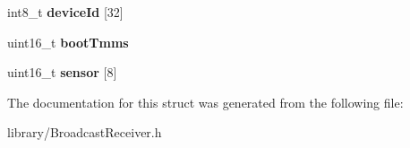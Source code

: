 \begin{DoxyCompactItemize}
\item 
\hypertarget{struct_broadcast_message_a5eed77683f928d1454419138eed7d673}{int8\-\_\-t {\bfseries device\-Id} \mbox{[}32\mbox{]}}\label{struct_broadcast_message_a5eed77683f928d1454419138eed7d673}

\item 
\hypertarget{struct_broadcast_message_a20abccb0a47e7956cd2a3bcd3299c23c}{uint16\-\_\-t {\bfseries boot\-Tmms}}\label{struct_broadcast_message_a20abccb0a47e7956cd2a3bcd3299c23c}

\item 
\hypertarget{struct_broadcast_message_adfe11beb5dc63400e112cfe2bf59fd0b}{uint16\-\_\-t {\bfseries sensor} \mbox{[}8\mbox{]}}\label{struct_broadcast_message_adfe11beb5dc63400e112cfe2bf59fd0b}

\end{DoxyCompactItemize}


The documentation for this struct was generated from the following file\-:\begin{DoxyCompactItemize}
\item 
library/Broadcast\-Receiver.\-h\end{DoxyCompactItemize}
